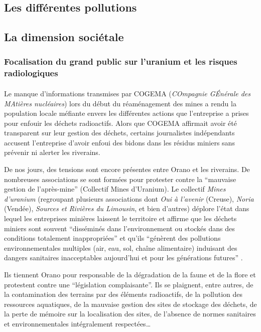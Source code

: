 \documentclass{article}
\begin{document}
\subsection{Les différentes pollutions}

 
\subsection{La dimension sociétale}
\subsubsection{Focalisation du grand public sur l'uranium et les risques radiologiques}
\paragraph{} Le manque d’informations transmises par COGEMA (\emph{COmpagnie GÉnérale des MAtières nucléaires}) lors du début du réaménagement des mines a rendu la population locale méfiante envers les différentes actions que l’entreprise a prises pour enfouir les déchets radioactifs. Alors que COGEMA affirmait avoir été transparent sur leur gestion des déchets, certains journalistes indépendants accusent l’entreprise d’avoir enfoui des bidons dans les résidus miniers sans prévenir ni alerter les riverains. 

De nos jours, des tensions sont encore présentes entre Orano et les riverains. De nombreuses associations se sont formées pour protester contre la “mauvaise gestion de l'après-mine” (Collectif Mines d’Uranium). Le collectif \emph{Mines d’uranium} (regroupant plusieurs associations dont \emph{Oui à l'avenir} (Creuse), \emph{Noria} (Vendée), \emph{Sources et Rivières du Limousin}, et bien d’autres) déplore l’état dans lequel les entreprises minières laissent le territoire et  affirme que les déchets miniers sont souvent “disséminés dans l’environnement ou stockés dans des conditions totalement inappropriées” et qu’ils “génèrent des pollutions environnementales multiples (air, eau, sol, chaîne alimentaire) induisant des dangers sanitaires inacceptables aujourd’hui et pour les générations futures” \cite{noauthor_declaration_2012}. 


Ils tiennent Orano pour responsable de la dégradation de la faune et de la flore et protestent contre une “législation complaisante”. Ils se plaignent, entre autres, de la contamination des terrains par des éléments radioactifs, de la pollution des ressources aquatiques, de la mauvaise gestion des sites de stockage des déchets, de la perte de mémoire sur la localisation des sites, de l’absence de normes sanitaires et environnementales intégralement respectées… 
\end{document}
